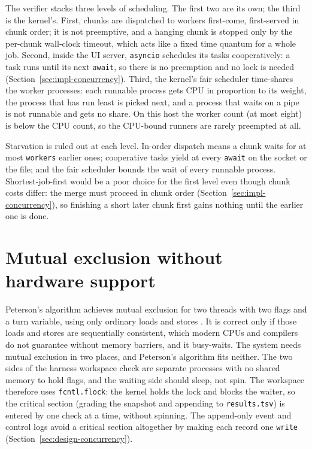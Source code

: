The verifier stacks three levels of scheduling. The first two are its own; the
third is the kernel's. First, chunks are dispatched to workers first-come,
first-served in chunk order; it is not preemptive, and a hanging chunk is stopped
only by the per-chunk wall-clock timeout, which acts like a fixed time quantum
for a whole job. Second, inside the UI server, \texttt{asyncio} schedules its
tasks cooperatively: a task runs until its next \texttt{await}, so there is no
preemption and no lock is needed (Section~\ref{sec:impl-concurrency}). Third, the
kernel's fair scheduler time-shares the worker processes: each runnable process
gets CPU in proportion to its weight, the process that has run least is picked
next, and a process that waits on a pipe is not runnable and gets no share. On
this host the worker count (at most eight) is below the CPU count, so the
CPU-bound runners are rarely preempted at all.

Starvation is ruled out at each level. In-order dispatch means a chunk waits for
at most \texttt{workers} earlier ones; cooperative tasks yield at every
\texttt{await} on the socket or the file; and the fair scheduler bounds the wait
of every runnable process. Shortest-job-first would be a poor choice for the
first level even though chunk costs differ: the merge must proceed in chunk order
(Section~\ref{sec:impl-concurrency}), so finishing a short later chunk first
gains nothing until the earlier one is done.

\section{Mutual exclusion without hardware support}

Peterson's algorithm achieves mutual exclusion for two threads with two flags
and a turn variable, using only ordinary loads and stores
\citep{herlihy2012art}. It is correct only if those loads and stores are
sequentially consistent, which modern CPUs and compilers do not guarantee
without memory barriers, and it busy-waits. The system needs mutual exclusion
in two places, and Peterson's algorithm fits neither. The two sides of the
harness workspace check are separate processes with no shared memory to hold
flags, and the waiting side should sleep, not spin. The workspace therefore uses
\texttt{fcntl.flock}: the kernel holds the lock and blocks the waiter, so the
critical section (grading the snapshot and appending to \texttt{results.tsv})
is entered by one check at a time, without spinning. The append-only event and
control logs avoid a critical section altogether by making each record one
\texttt{write} (Section~\ref{sec:design-concurrency}).

